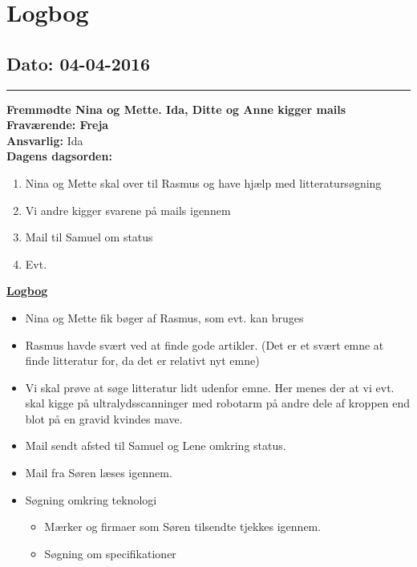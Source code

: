 \chapter{Logbog}
\section{Dato: 04-04-2016}
\hrule
\textbf{Fremmødte Nina og Mette. Ida, Ditte og Anne kigger mails} \\
\textbf{Fraværende: Freja } \\
\textbf{Ansvarlig:} Ida  \\
\textbf{Dagens dagsorden: }
\begin{enumerate}
	\item Nina og Mette skal over til Rasmus og have hjælp med litteratursøgning
	\item Vi andre kigger svarene på mails igennem
	\item Mail til Samuel om status 
	\item Evt. 
\end{enumerate}

\underline{\textbf{Logbog}}
\begin{itemize}
\item Nina og Mette fik bøger af Rasmus, som evt. kan bruges
\item Rasmus havde svært ved at finde gode artikler. (Det er et svært emne at finde litteratur for, da det er relativt nyt emne)
\item Vi skal prøve at søge litteratur lidt udenfor emne. Her menes der at vi evt. skal kigge på ultralydsscanninger med robotarm på andre dele af kroppen end blot på en gravid kvindes mave.
\end{itemize}
\begin{itemize}
\item Mail sendt afsted til Samuel og Lene omkring status.
\item Mail fra Søren læses igennem. 
\item Søgning omkring teknologi
\begin{itemize}
\item Mærker og firmaer som Søren tilsendte tjekkes igennem.
\item Søgning om specifikationer
\end{itemize}
\end{itemize}
\newpage
